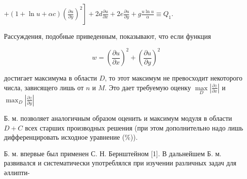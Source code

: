 \documentclass[10pt]{article}
\begin{document}
$\left.+(1+\ln u+\alpha c)\left(\frac{\partial u}{\partial y}\right)^{2}\right]+2 d \frac{\partial u}{\partial x}+2 e \frac{\partial u}{\partial y}+g \frac{u \ln u}{\alpha} \equiv Q_{1}$.



Рассуждения, подобные приведенным, показывают, что если функция



\[

w=\left(\frac{\partial u}{\partial x}\right)^{2}+\left(\frac{\partial u}{\partial y}\right)^{2}

\]



достигает максимума в области $D$, то этот максимум не превосходит некоторого числа, зависящего лишь от $n$ и $M$. Это дает требуемую оценку $\underset{D}{\max }\left|\frac{\partial z}{\partial x}\right|$ и $\max _{D}\left|\frac{\partial z}{\partial y}\right|$



Б. м. позволяет аналогичным образом оценить и максимум модуля в области $D+C$ всех старших производных решения (при этом дополнительно надо лишь дифференцировать исходное уравнение (\%)).



Б. м. впервые был применен С. Н. Бернштейном [1]. В дальнейшем Б. м. развивался и систематически употреблялся при изучении различных задач для әллипти-
\end{document}
